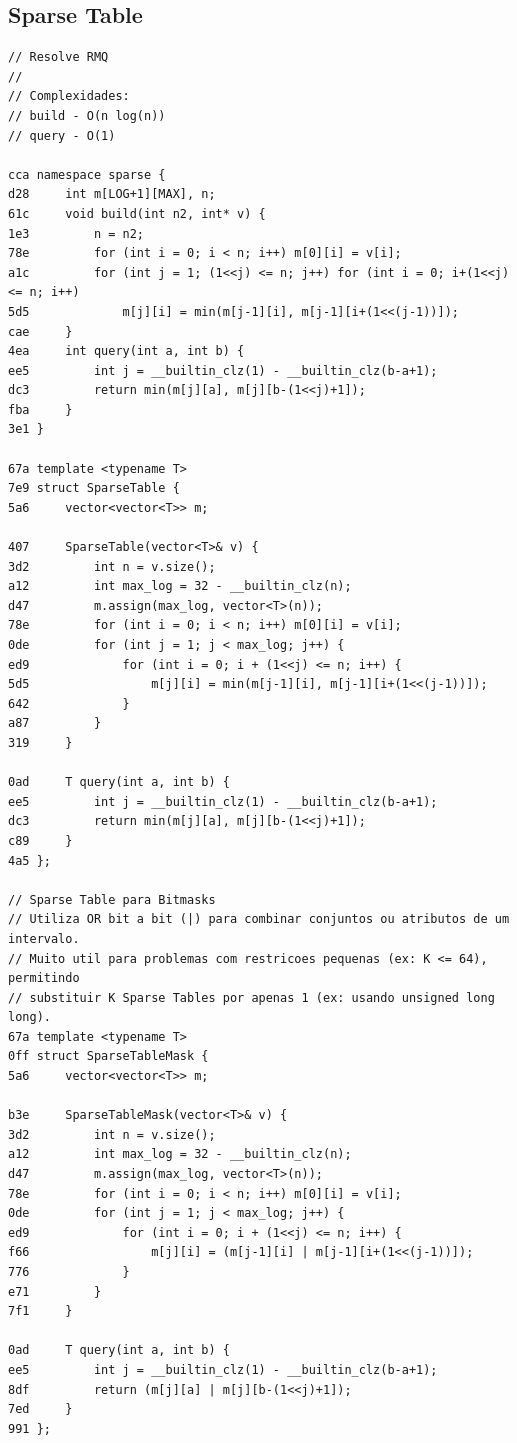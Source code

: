 \documentclass[11pt, a4paper, twoside]{article}
\begin{document}
\subsection{Sparse Table}
\begin{lstlisting}
// Resolve RMQ
//
// Complexidades:
// build - O(n log(n))
// query - O(1)

cca namespace sparse {
d28 	int m[LOG+1][MAX], n;
61c 	void build(int n2, int* v) {
1e3 		n = n2;
78e 		for (int i = 0; i < n; i++) m[0][i] = v[i];
a1c 		for (int j = 1; (1<<j) <= n; j++) for (int i = 0; i+(1<<j) <= n; i++)
5d5 			m[j][i] = min(m[j-1][i], m[j-1][i+(1<<(j-1))]);
cae 	}
4ea 	int query(int a, int b) {
ee5 		int j = __builtin_clz(1) - __builtin_clz(b-a+1);
dc3 		return min(m[j][a], m[j][b-(1<<j)+1]);
fba 	}
3e1 }

67a template <typename T>
7e9 struct SparseTable {
5a6 	vector<vector<T>> m;
    	
407 	SparseTable(vector<T>& v) {
3d2 		int n = v.size();
a12 		int max_log = 32 - __builtin_clz(n);
d47 		m.assign(max_log, vector<T>(n));
78e 		for (int i = 0; i < n; i++) m[0][i] = v[i];
0de 		for (int j = 1; j < max_log; j++) {
ed9 			for (int i = 0; i + (1<<j) <= n; i++) {
5d5 				m[j][i] = min(m[j-1][i], m[j-1][i+(1<<(j-1))]);
642 			}
a87 		}
319 	}
    	
0ad 	T query(int a, int b) {
ee5 		int j = __builtin_clz(1) - __builtin_clz(b-a+1);
dc3 		return min(m[j][a], m[j][b-(1<<j)+1]);
c89 	}
4a5 };

// Sparse Table para Bitmasks
// Utiliza OR bit a bit (|) para combinar conjuntos ou atributos de um intervalo.
// Muito util para problemas com restricoes pequenas (ex: K <= 64), permitindo
// substituir K Sparse Tables por apenas 1 (ex: usando unsigned long long).
67a template <typename T>
0ff struct SparseTableMask {
5a6 	vector<vector<T>> m;
    	
b3e 	SparseTableMask(vector<T>& v) {
3d2 		int n = v.size();
a12 		int max_log = 32 - __builtin_clz(n);
d47 		m.assign(max_log, vector<T>(n));
78e 		for (int i = 0; i < n; i++) m[0][i] = v[i];
0de 		for (int j = 1; j < max_log; j++) {
ed9 			for (int i = 0; i + (1<<j) <= n; i++) {
f66 				m[j][i] = (m[j-1][i] | m[j-1][i+(1<<(j-1))]);
776 			}
e71 		}
7f1 	}
    	
0ad 	T query(int a, int b) {
ee5 		int j = __builtin_clz(1) - __builtin_clz(b-a+1);
8df 		return (m[j][a] | m[j][b-(1<<j)+1]);
7ed 	}
991 };
\end{lstlisting}
\end{document}

